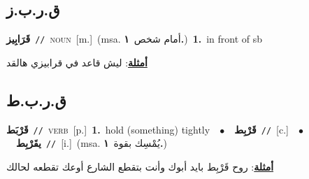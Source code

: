\documentclass[10pt,a4paper,twoside]{article} %
\begin{document}
\begin{multicols}{2}
\vspace{-3mm}
\subsection*{\color{blue}\foreignlanguage{arabic}{ق.ر.ب.ز}\color{blue}{}} 

{\setlength\topsep{0pt}\textbf{\foreignlanguage{arabic}{قَرَابِيز}}\ {\color{gray}\texttt{//}\color{black}}\ \textsc{noun}\ [m.]\ \color{gray}(msa. \foreignlanguage{arabic}{أمام شخص}~\foreignlanguage{arabic}{\textbf{١.}})\color{black}\ \textbf{1.}~in front of sb\  \begin{flushright}\color{gray}\foreignlanguage{arabic}{\textbf{\underline{\foreignlanguage{arabic}{أمثلة}}}: ليش قاعد في قرابيزي هالقد}\end{flushright}\color{black}} \vspace{2mm}

\vspace{-3mm}
\subsection*{\color{blue}\foreignlanguage{arabic}{ق.ر.ب.ط}\color{blue}{}} 

{\setlength\topsep{0pt}\textbf{\foreignlanguage{arabic}{قَرْبَط}}\ {\color{gray}\texttt{//}\color{black}}\ \textsc{verb}\ [p.]\ \textbf{1.}~hold (something) tightly\ \ $\bullet$\ \ \setlength\topsep{0pt}\textbf{\foreignlanguage{arabic}{قَرْبِط}}\ {\color{gray}\texttt{//}\color{black}}\ [c.]\ \ $\bullet$\ \ \setlength\topsep{0pt}\textbf{\foreignlanguage{arabic}{يقَرْبِط}}\ {\color{gray}\texttt{//}\color{black}}\ [i.]\ \color{gray}(msa. \foreignlanguage{arabic}{يُمْسِك بقوة}~\foreignlanguage{arabic}{\textbf{١.}})\color{black}\  \begin{flushright}\color{gray}\foreignlanguage{arabic}{\textbf{\underline{\foreignlanguage{arabic}{أمثلة}}}: روح قَرْبِط بايد أبوك وأنت بتقطع الشارع أوعك تقطعه لحالك}\end{flushright}\color{black}} \vspace{2mm}


\end{multicols}
\end{document}
